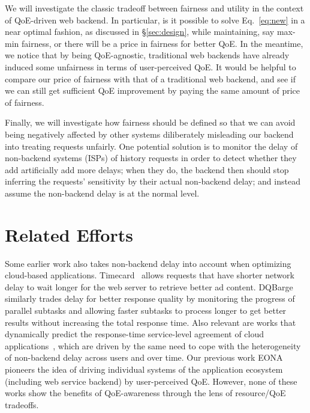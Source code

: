 We will investigate the classic tradeoff between fairness and utility in the context of QoE-driven web backend. In particular, is it possible to solve Eq.~\ref{eq:new} in a near optimal fashion, as discussed in \S\ref{sec:design}, while maintaining, say max-min fairness, or there will be a price in fairness for better QoE.
In the meantime, we notice that by being QoE-agnostic, traditional web backends have already induced some unfairness in terms of user-perceived QoE. It would be helpful to compare our price of fairness with that of a traditional web backend, and see if we can still get sufficient QoE improvement by paying the same amount of price of fairness.

Finally, we will investigate how fairness should be defined so that we can avoid being negatively affected by other systems diliberately misleading our backend into treating requests unfairly. One potential solution is to monitor the delay of non-backend systems (\eg ISPs) of history requests in order to detect whether they add artificially add more delays; when they do, the backend then should stop inferring the requests' sensitivity by their actual non-backend delay; and instead assume the non-backend delay is at the normal level.


\section{Related Efforts}
Some earlier work also takes non-backend delay into account when optimizing cloud-based applications. 
Timecard~\cite{timecard} allows requests that have shorter network delay to wait longer for the web server to retrieve better ad content. 
DQBarge~\cite{dqbarge} similarly trades delay for better response quality by monitoring the progress of parallel subtasks and allowing faster subtasks to process longer to get better results without increasing the total response time.
Also relevant are works that dynamically predict the response-time service-level agreement of cloud applications~\cite{Rich Wolski}, which are driven by the same need to cope with the heterogeneity of non-backend delay across users and over time.
Our previous work EONA~\cite{eona} pioneers the idea of driving individual systems of the application ecosystem (including web service backend) by user-perceived QoE.
However, none of these works show the benefits of QoE-awareness through the lens of resource/QoE tradeoffs. 



